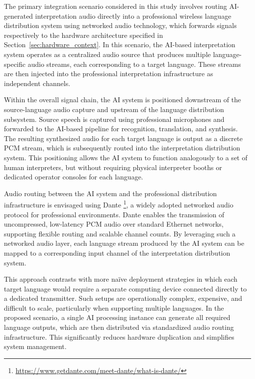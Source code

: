 
The primary integration scenario considered in this study involves routing AI-generated interpretation audio directly into a professional wireless language distribution system using networked audio technology, which forwards signals respectively to the hardware architecture specified in Section~\ref{sec:hardware_context}. In this scenario, the AI-based interpretation system operates as a centralized audio source that produces multiple language-specific audio streams, each corresponding to a target language. These streams are then injected into the professional interpretation infrastructure as independent channels.

Within the overall signal chain, the AI system is positioned downstream of the source-language audio capture and upstream of the language distribution subsystem. Source speech is captured using professional microphones and forwarded to the AI-based pipeline for recognition, translation, and synthesis. The resulting synthesized audio for each target language is output as a discrete PCM stream, which is subsequently routed into the interpretation distribution system. This positioning allows the AI system to function analogously to a set of human interpreters, but without requiring physical interpreter booths or dedicated operator consoles for each language.

Audio routing between the AI system and the professional distribution infrastructure is envisaged using Dante \footnote{\url{https://www.getdante.com/meet-dante/what-is-dante/}}, a widely adopted networked audio protocol for professional environments. Dante enables the transmission of uncompressed, low-latency PCM audio over standard Ethernet networks, supporting flexible routing and scalable channel counts. By leveraging such a networked audio layer, each language stream produced by the AI system can be mapped to a corresponding input channel of the interpretation distribution system.

This approach contrasts with more naïve deployment strategies in which each target language would require a separate computing device connected directly to a dedicated transmitter. Such setups are operationally complex, expensive, and difficult to scale, particularly when supporting multiple languages. In the proposed scenario, a single AI processing instance can generate all required language outputs, which are then distributed via standardized audio routing infrastructure. This significantly reduces hardware duplication and simplifies system management.

